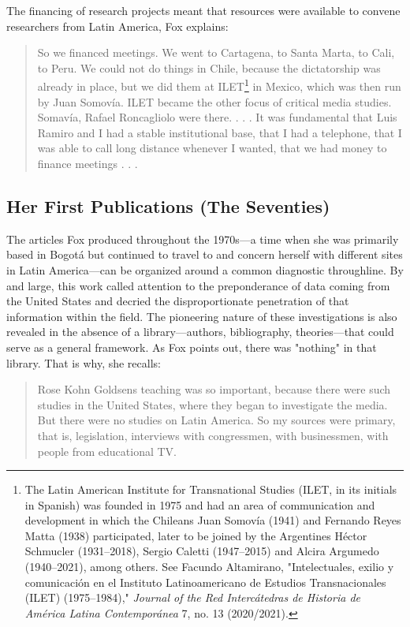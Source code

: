 \documentclass{tufte-handout}
\begin{document}
\noindent The financing of research projects meant that resources were available
to convene researchers from Latin America, Fox explains:

\begin{quote}
So we financed meetings. We went to Cartagena, to Santa Marta, to Cali,
to Peru. We could not do things in Chile, because the dictatorship was
already in place, but we did them at ILET\footnote{The Latin American
  Institute for Transnational Studies (ILET, in its initials in Spanish)
  was founded in 1975 and had an area of communication and development
  in which the Chileans Juan Somovía (1941) and Fernando Reyes Matta
  (1938) participated, later to be joined by the Argentines Héctor
  Schmucler (1931--2018), Sergio Caletti (1947--2015) and Alcira
  Argumedo (1940--2021), among others. See Facundo Altamirano,
  "Intelectuales, exilio y comunicación en el Instituto Latinoamericano
  de Estudios Transnacionales (ILET) (1975--1984)," \emph{Journal of the
  Red Intercátedras de Historia de América Latina Contemporánea} 7, no.
  13 (2020/2021).} in Mexico, which was then run by Juan Somovía. ILET
became the other focus of critical media studies. Somavía, Rafael
Roncagliolo were there. . . . It was fundamental that Luis Ramiro and I
had a stable institutional base, that I had a telephone, that I was able
to call long distance whenever I wanted, that we had money to finance
meetings . . .
\end{quote}

\hypertarget{her-first-publications-the-seventies}{%
\subsection{Her First Publications (The
Seventies)}\label{her-first-publications-the-seventies}}

The articles Fox produced throughout the 1970s---a time when she was
primarily based in Bogotá but continued to travel to and concern herself
with different sites in Latin America---can be organized around a common
diagnostic throughline. By and large, this work called attention to the
preponderance of data coming from the United States and decried the
disproportionate penetration of that information within the field. The
pioneering nature of these investigations is also revealed in the
absence of a library---authors, bibliography, theories---that could
serve as a general framework. As Fox points out, there was "nothing" in
that library. That is why, she recalls:

\begin{quote}
Rose Kohn Goldsen\textquotesingle s teaching was so important, because
there were such studies in the United States, where they began to
investigate the media. But there were no studies on Latin America. So my
sources were primary, that is, legislation, interviews with congressmen,
with businessmen, with people from educational TV.
\end{quote}
\end{document}
